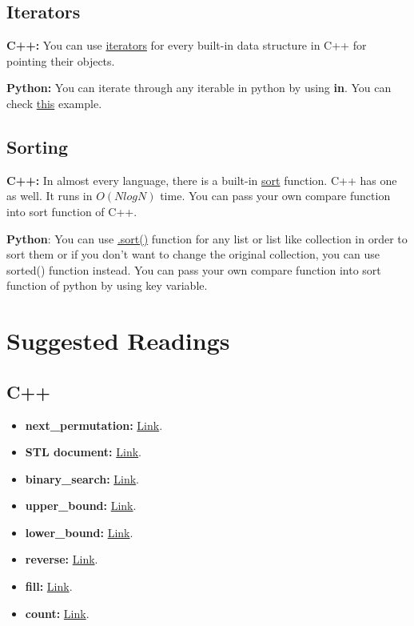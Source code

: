 \documentclass[12pt]{article}
\begin{document}
\subsection{Iterators}

\textbf{C++:} You can use \href{http://www.cplusplus.com/reference/iterator/}{iterators} for every built-in data structure in C++ for pointing their objects.

\textbf{Python: } You can iterate through any iterable in python by using \textbf{in}. You can check \href{https://wiki.python.org/moin/ForLoop}{this} example.

\subsection{Sorting}

\textbf{C++:} In almost every language, there is a built-in \href{http://www.cplusplus.com/reference/algorithm/sort/}{sort} function. C++ has one as well. It runs in $O(N log N)$ time. You can pass your own compare function into sort function of C++.

\textbf{Python}: You can use \href{https://docs.python.org/3/howto/sorting.html}{.sort()} function for any list or list like collection in order to sort them or if you don't want to change the original collection, you can use sorted() function instead. You can pass your own compare function into sort function of python by using key variable.

\section{Suggested Readings}

\subsection{C++}

\begin{itemize}
    \item \textbf{next\_permutation: } \href{http://www.cplusplus.com/reference/algorithm/next_permutation/}{Link}.
    \item \textbf{STL document:} \href{http://www.cplusplus.com/reference/stl/}{Link}.
    \item \textbf{binary\_search: } \href{http://www.cplusplus.com/reference/algorithm/binary_search/}{Link}.
    \item \textbf{upper\_bound:} \href{http://www.cplusplus.com/reference/algorithm/upper_bound/}{Link}.
    \item \textbf{lower\_bound:} \href{http://www.cplusplus.com/reference/algorithm/lower_bound/}{Link}.
    \item \textbf{reverse:} \href{http://www.cplusplus.com/reference/algorithm/reverse/}{Link}.
    \item \textbf{fill:} \href{http://www.cplusplus.com/reference/algorithm/fill/}{Link}.
    \item \textbf{count:} \href{http://www.cplusplus.com/reference/algorithm/count/}{Link}.
\end{itemize}
\end{document}
